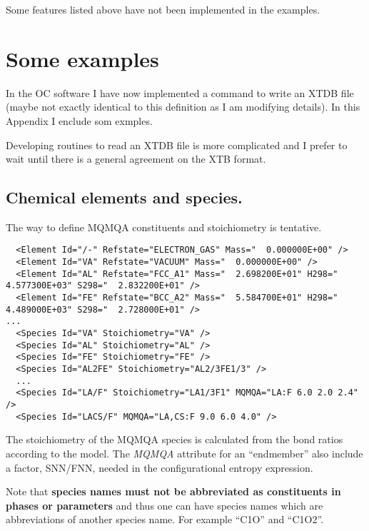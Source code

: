 \documentclass{article}
\begin{document}
\newpage
\begin{appendices}
\setcounter{equation}{0}
\renewcommand{\theequation}{A\arabic{equation}}
\setcounter{figure}{0}
\renewcommand{\thefigure}{A\arabic{figure}}

Some features listed above have not been implemented in the examples.

\section{Some examples}\label{sec:examples}

In the OC software I have now implemented a command to write an XTDB
file (maybe not exactly identical to this definition as I am modifying
details).  In this Appendix I enclude som exmples.

Developing routines to read an XTDB file is more complicated and I
prefer to wait until there is a general agreement on the XTB format.

\subsection{Chemical elements and species.}\label{sec:elementexample}

The way to define MQMQA constituents and stoichiometry is tentative.

{\small
\begin{verbatim}
  <Element Id="/-" Refstate="ELECTRON_GAS" Mass="  0.000000E+00" />
  <Element Id="VA" Refstate="VACUUM" Mass="  0.000000E+00" />
  <Element Id="AL" Refstate="FCC_A1" Mass="  2.698200E+01" H298="  4.577300E+03" S298="  2.832200E+01" />
  <Element Id="FE" Refstate="BCC_A2" Mass="  5.584700E+01" H298="  4.489000E+03" S298="  2.728000E+01" />
...
  <Species Id="VA" Stoichiometry="VA" />
  <Species Id="AL" Stoichiometry="AL" />
  <Species Id="FE" Stoichiometry="FE" />
  <Species Id="AL2FE" Stoichiometry="AL2/3FE1/3" />
  ...
  <Species Id="LA/F" Stoichiometry="LA1/3F1" MQMQA="LA:F 6.0 2.0 2.4" />
  <Species Id="LACS/F" MQMQA="LA,CS:F 9.0 6.0 4.0" />
\end{verbatim}
}

The stoichiometry of the MQMQA species is calculated from the bond
ratios according to the model.  The {\em MQMQA} attribute for an
``endmember'' also include a factor, SNN/FNN, needed in the
configurational entropy expression.

Note that {\bf species names must not be abbreviated as constituents in
  phases or parameters} and thus one can have species names which are
abbreviations of another species name.  For example ``C1O'' and
``C1O2''.


\end{appendices}
\end{document}

